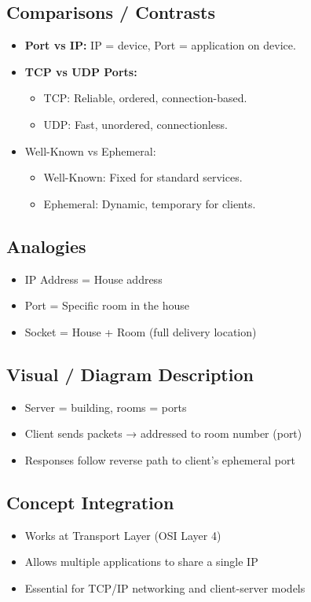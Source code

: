 \documentclass[12pt]{article}
\begin{document}
\subsection{Comparisons / Contrasts}
\begin{itemize}
    \item \textbf{Port vs IP:} IP = device, Port = application on device.
    \item \textbf{TCP vs UDP Ports:}
          \begin{itemize}
              \item TCP: Reliable, ordered, connection-based.
              \item UDP: Fast, unordered, connectionless.
          \end{itemize}
    \item Well-Known vs Ephemeral:
          \begin{itemize}
              \item Well-Known: Fixed for standard services.
              \item Ephemeral: Dynamic, temporary for clients.
          \end{itemize}
\end{itemize}

\subsection{Analogies}
\begin{itemize}
    \item IP Address = House address
    \item Port = Specific room in the house
    \item Socket = House + Room (full delivery location)
\end{itemize}

\subsection{Visual / Diagram Description}
\begin{itemize}
    \item Server = building, rooms = ports
    \item Client sends packets → addressed to room number (port)
    \item Responses follow reverse path to client's ephemeral port
\end{itemize}

\subsection{Concept Integration}
\begin{itemize}
    \item Works at Transport Layer (OSI Layer 4)
    \item Allows multiple applications to share a single IP
    \item Essential for TCP/IP networking and client-server models
\end{itemize}
\end{document}
